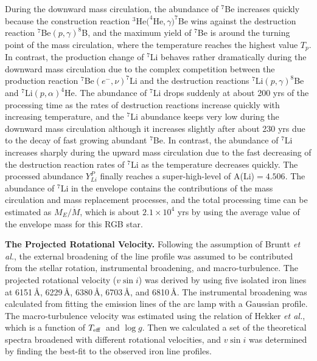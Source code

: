 \documentclass[twoside,onecolumnm,12pt]{article}
\newcommand{\upcite}[1]{\textsuperscript{\textsuperscript{\cite{#1}}}}
\newcommand{\Teff}{$T_{\rm eff}$}
\newcommand{\logg}{$\log g$}
\begin{document}
During the downward mass circulation, the abundance of $^7$Be increases quickly because the construction reaction $^3$He$(^4$He$,\gamma)^7$Be wins against the destruction reaction $^7$Be$(p,\gamma)^8$B, and the maximum yield of $^7$Be is around the turning point of the mass circulation, where the temperature reaches the highest value $T_p$. In contrast, the production change of $^7$Li behaves rather dramatically  during the downward mass circulation due to the complex competition between the production reaction $^7$Be$(e^-,\nu)^7$Li and the destruction reactions $^7$Li$(p,\gamma)^8$Be and $^7$Li$(p,\alpha)^4$He. The abundance of $^7$Li drops suddenly at about 200 yrs of the processing time as the rates of destruction reactions increase quickly with increasing temperature, and the $^7$Li abundance keeps very low during the downward mass circulation although it increases slightly after about 230 yrs due to the decay of fast growing abundant $^7$Be. In contrast, the abundance of $^7$Li increases sharply during the upward mass circulation due to the fast decreasing of the destruction reaction rates of $^7$Li as the temperature decreases quickly. The processed abundance $Y^P_{Li}$ finally reaches a super-high-level of A(Li)$=4.506$. The abundance of $^7$Li in the envelope contains the contributions of the mass circulation and mass replacement processes, and the total processing time can be estimated as $M_E/\dot{M}$, which is about $2.1\times10^4$ yrs by using the average value of the envelope mass for this RGB star. 


\vspace{10pt}
\noindent\textbf{The Projected Rotational Velocity.} Following the assumption of Bruntt \emph{et al.}\upcite{Bruntt2015}, the external broadening of the line profile was assumed to be contributed from the stellar rotation, instrumental broadening, and macro-turbulence. The projected rotational velocity ($v\sin i$) was derived by using five isolated iron lines at 6151\,\AA, 6229\,\AA, 6380\,\AA, 6703\,\AA, and 6810\,\AA. The instrumental broadening was calculated from fitting the emission lines of the arc lamp with a Gaussian profile. The macro-turbulence velocity was estimated using the relation of Hekker \emph{et al.}\upcite{Hekker2007}, which is a function of \Teff\ and \logg. Then we calculated a set of the theoretical spectra broadened with different rotational velocities, and $v\sin i$  was determined by finding the best-fit to the observed iron line profiles.\\
\end{document}
